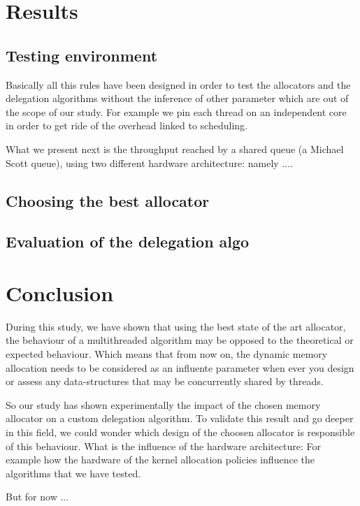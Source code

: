 \documentclass[10pt]{article}											%
\begin{document}
\section{Results}
\subsection{Testing environment}
Basically all this rules have been designed in order to test the allocators and the delegation algorithms without the inference of other parameter which are out of the scope of our study.   For example we pin each thread on an independent core in order to get ride of the overhead linked to scheduling.

What we present next is the throughput reached by a shared queue (a Michael Scott queue), using two different hardware architecture: namely ....
\subsection{Choosing the best allocator}
\subsection{Evaluation of the delegation algo}

\newpage

\section{Conclusion}
During this study, we have shown that using the best state of the art allocator, the behaviour of a multithreaded algorithm may be opposed to the theoretical or expected behaviour.
Which means that from now on, the dynamic memory allocation needs to be considered as an influente parameter when ever you design or assess any data-structures that may be concurrently shared by threads.

So our study has shown experimentally the impact of the chosen memory allocator on a custom delegation algorithm.   To validate this result and go deeper in this field, we could wonder which design of the choosen allocator is responsible of this behaviour.   What is the influence of the hardware architecture: For example how the hardware of the kernel allocation policies influence the algorithms that we have tested.

But for now ...
\end{document}
